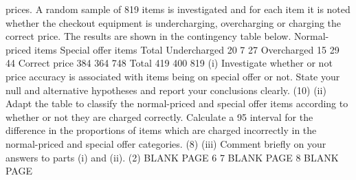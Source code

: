 prices. A random sample of 819 items is investigated and for each item it is noted
whether the checkout equipment is undercharging, overcharging or charging the
correct price. The results are shown in the contingency table below.
Normal-priced items Special offer items Total
Undercharged 20 7 27
Overcharged 15 29 44
Correct price 384 364 748
Total 419 400 819
(i) Investigate whether or not price accuracy is associated with items being on
special offer or not. State your null and alternative hypotheses and report your
conclusions clearly.
(10)
(ii) Adapt the table to classify the normal-priced and special offer items according
to whether or not they are charged correctly. Calculate a 95%
interval for the difference in the proportions of items which are charged
incorrectly in the normal-priced and special offer categories.
(8)
(iii) Comment briefly on your answers to parts (i) and (ii).
(2)
BLANK PAGE
6
7
BLANK PAGE
8
BLANK PAGE
